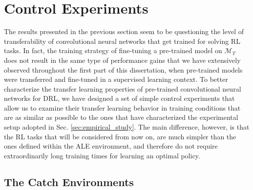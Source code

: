 \section{Control Experiments}

The results presented in the previous section seem to be questioning the level of transferability of convolutional neural networks that get trained for solving RL tasks. In fact, the training strategy of fine-tuning a pre-trained model on $\mathcal{M}_T$ does not result in the same type of performance gains that we have extensively observed throughout the first part of this dissertation, when pre-trained models were transferred and fine-tuned in a supervised learning context. To better characterize the transfer learning properties of pre-trained convolutional neural networks for DRL, we have designed a set of simple control experiments that allow us to examine their transfer learning behavior in training conditions that are as similar as possible to the ones that have characterized the experimental setup adopted in Sec. \ref{sec:empirical_study}. The main difference, however, is that the RL tasks that will be considered from now on, are much simpler than the ones defined within the ALE environment, and therefore do not require extraordinarily long training times for learning an optimal policy.   

\subsection{The Catch Environments}

